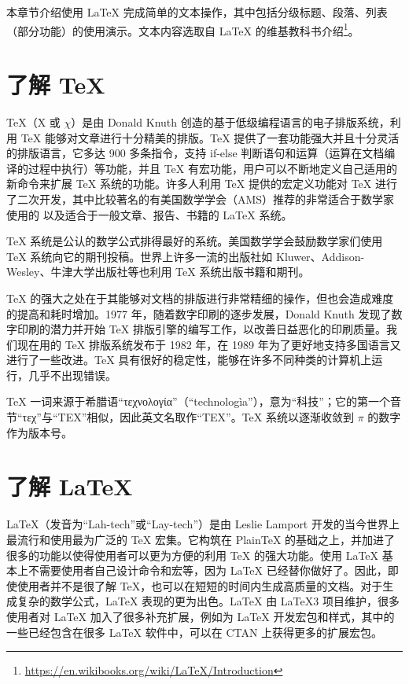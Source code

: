 \documentclass[report, twoside, UTF8, AutoFakeBold = 1, AutoFakeSlant, zihao = -4]{config}
\begin{document}
本章节介绍使用 \LaTeX{} 完成简单的文本操作，其中包括分级标题、段落、列表（部分功能）的使用演示。文本内容选取自 \LaTeX{} 的维基教科书介绍\footnote{\url{https://en.wikibooks.org/wiki/LaTeX/Introduction}}。

\section{了解 \TeX{}}

\TeX{}（X 或 $\chi$）是由 Donald Knuth 创造的基于低级编程语言的电子排版系统，利用 \TeX{} 能够对文章进行十分精美的排版。\TeX{} 提供了一套功能强大并且十分灵活的排版语言，它多达 900 多条指令，支持 if-else 判断语句和运算（运算在文档编译的过程中执行）等功能，并且 \TeX{} 有宏功能，用户可以不断地定义自己适用的新命令来扩展 \TeX{} 系统的功能。许多人利用 \TeX{} 提供的宏定义功能对 \TeX{} 进行了二次开发，其中比较著名的有美国数学学会（AMS）推荐的非常适合于数学家使用的  以及适合于一般文章、报告、书籍的 \LaTeX{} 系统。

\TeX{} 系统是公认的数学公式排得最好的系统。美国数学学会鼓励数学家们使用 \TeX{} 系统向它的期刊投稿。世界上许多一流的出版社如 Kluwer、Addison-Wesley、牛津大学出版社等也利用 \TeX{} 系统出版书籍和期刊。

\TeX{} 的强大之处在于其能够对文档的排版进行非常精细的操作，但也会造成难度的提高和耗时增加。1977 年，随着数字印刷的逐步发展，Donald Knuth 发现了数字印刷的潜力并开始 \TeX{} 排版引擎的编写工作，以改善日益恶化的印刷质量。我们现在用的 \TeX{} 排版系统发布于 1982 年，在 1989 年为了更好地支持多国语言又进行了一些改进。\TeX{} 具有很好的稳定性，能够在许多不同种类的计算机上运行，几乎不出现错误。

\TeX{} 一词来源于希腊语“τεχνολογία”（“technologìa”），意为“科技”；它的第一个音节“τεχ”与“TEX”相似，因此英文名取作“TEX”。\TeX{} 系统以逐渐收敛到 $\pi$ 的数字作为版本号。

\section{了解 \LaTeX{}}

\LaTeX{}（发音为“Lah-tech”或“Lay-tech”）是由 Leslie Lamport 开发的当今世界上最流行和使用最为广泛的 \TeX{} 宏集。它构筑在 PlainTeX 的基础之上，并加进了很多的功能以使得使用者可以更为方便的利用 \TeX{} 的强大功能。使用 \LaTeX{} 基本上不需要使用者自己设计命令和宏等，因为 \LaTeX{} 已经替你做好了。因此，即使使用者并不是很了解 \TeX{}，也可以在短短的时间内生成高质量的文档。对于生成复杂的数学公式，\LaTeX{} 表现的更为出色。\LaTeX{} 由 \LaTeX{3} 项目维护，很多使用者对 \LaTeX{} 加入了很多补充扩展，例如为 \LaTeX{} 开发宏包和样式，其中的一些已经包含在很多 \LaTeX{} 软件中，可以在 CTAN 上获得更多的扩展宏包。
\end{document}
